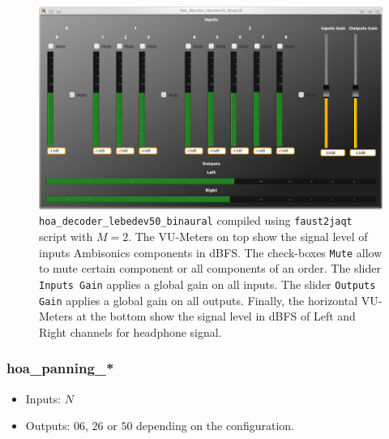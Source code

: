 \documentclass[10pt,a4paper]{article}
\begin{document}
\begin{figure}[!ht]
\centering
\includegraphics[width=\columnwidth]{hoa_decoder_lebedev50_binaural.png}
\caption{\lstinline'hoa_decoder_lebedev50_binaural' compiled using \lstinline'faust2jaqt' script with $M=2$. The VU-Meters on top show the signal level of inputs Ambisonics components in dBFS. The check-boxes \lstinline'Mute' allow to mute certain component or all components of an order. The slider \lstinline'Inputs Gain' applies a global gain on all inputs. The slider \lstinline'Outputs Gain' applies a global gain on all outputs. Finally, the horizontal VU-Meters at the bottom show the signal level in dBFS of Left and Right channels for headphone signal.}
\label{fig:hoa_decoder_lebedev50_binaural}
\end{figure}
\pagebreak

\subsubsection{hoa\_panning\_*}
\label{section:hoa_panning}
\begin{itemize}
\item Inputs: $N$
\item Outputs: $06$, $26$ or $50$ depending on the configuration.
\end{itemize}
\end{document}
